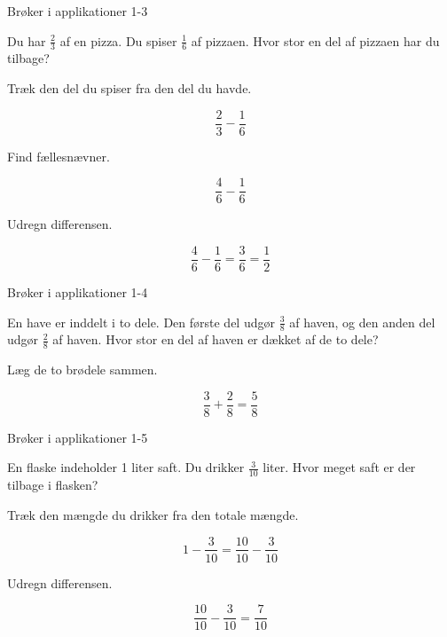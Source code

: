 \documentclass{article}
\begin{document}
\begin{exercise}{Brøker i applikationer 1-3}

Du har $\frac{2}{3}$ af en pizza. Du spiser $\frac{1}{6}$ af pizzaen. Hvor stor en del af pizzaen har du tilbage?


\hint

Træk den del du spiser fra den del du havde.

\hint
\[
\frac{2}{3} - \frac{1}{6}
\]

\hint

Find fællesnævner.

\hint
\[
\frac{4}{6} - \frac{1}{6}
\]

\hint

Udregn differensen.

\hint
\[
\frac{4}{6} - \frac{1}{6} = \frac{3}{6} = \frac{1}{2}
\]

\end{exercise}

\newpage

\begin{exercise}{Brøker i applikationer 1-4}

En have er inddelt i to dele. Den første del udgør $\frac{3}{8}$ af haven, og den anden del udgør $\frac{2}{8}$ af haven. Hvor stor en del af haven er dækket af de to dele?


\hint

Læg de to brødele sammen.

\hint
\[
\frac{3}{8} + \frac{2}{8} = \frac{5}{8}
\]

\end{exercise}

\newpage

\begin{exercise}{Brøker i applikationer 1-5}

En flaske indeholder 1 liter saft. Du drikker $\frac{3}{10}$ liter. Hvor meget saft er der tilbage i flasken?


\hint

Træk den mængde du drikker fra den totale mængde.

\hint
\[
1 - \frac{3}{10} = \frac{10}{10} - \frac{3}{10}
\]

\hint

Udregn differensen.

\hint
\[
\frac{10}{10} - \frac{3}{10} = \frac{7}{10}
\]

\end{exercise}
\end{document}
